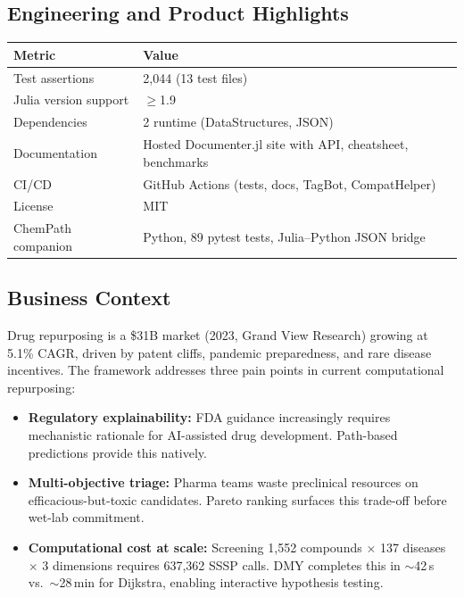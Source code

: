 \documentclass[11pt,a4paper]{article}
\begin{document}
\subsection{Engineering and Product Highlights}

\begin{tabular}{ll}
\toprule
\textbf{Metric} & \textbf{Value} \\
\midrule
Test assertions & 2{,}044 (13 test files) \\
Julia version support & $\geq$1.9 \\
Dependencies & 2 runtime (DataStructures, JSON) \\
Documentation & Hosted Documenter.jl site with API, cheatsheet, benchmarks \\
CI/CD & GitHub Actions (tests, docs, TagBot, CompatHelper) \\
License & MIT \\
ChemPath companion & Python, 89 pytest tests, Julia--Python JSON bridge \\
\bottomrule
\end{tabular}

\subsection{Business Context}

Drug repurposing is a \$31B market (2023, Grand View Research)
growing at 5.1\% CAGR, driven by patent cliffs, pandemic
preparedness, and rare disease incentives.  The framework addresses
three pain points in current computational repurposing:

\begin{itemize}
    \item \textbf{Regulatory explainability:} FDA guidance
    increasingly requires mechanistic rationale for AI-assisted drug
    development.  Path-based predictions provide this natively.

    \item \textbf{Multi-objective triage:} Pharma teams waste
    preclinical resources on efficacious-but-toxic candidates.
    Pareto ranking surfaces this trade-off before wet-lab commitment.

    \item \textbf{Computational cost at scale:} Screening 1{,}552
    compounds $\times$ 137 diseases $\times$ 3 dimensions
    requires 637{,}362 SSSP calls.  DMY completes this in
    $\sim$42\,s vs.\ $\sim$28\,min for Dijkstra, enabling
    interactive hypothesis testing.
\end{itemize}
\end{document}
